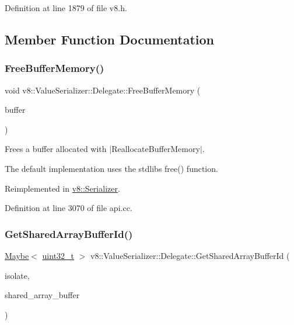 Definition at line 1879 of file v8.\+h.



\subsection{Member Function Documentation}
\mbox{\label{classv8_1_1ValueSerializer_1_1Delegate_a9cd4ab0061b4a26b4b0d695d31992f82}} 
\subsubsection{\texorpdfstring{Free\+Buffer\+Memory()}{FreeBufferMemory()}}
{\footnotesize\ttfamily void v8\+::\+Value\+Serializer\+::\+Delegate\+::\+Free\+Buffer\+Memory (\begin{DoxyParamCaption}\item[{void $\ast$}]{buffer }\end{DoxyParamCaption})\hspace{0.3cm}{\ttfamily [virtual]}}

Frees a buffer allocated with $\vert$\+Reallocate\+Buffer\+Memory$\vert$.

The default implementation uses the stdlib\textquotesingle{}s {\ttfamily free()} function. 

Reimplemented in \mbox{\hyperlink{classv8_1_1Serializer_af406a9e21fccfce3a5faed52182a69a6}{v8\+::\+Serializer}}.



Definition at line 3070 of file api.\+cc.

\mbox{\label{classv8_1_1ValueSerializer_1_1Delegate_ac12b5cfd7480c19f0b9af0b47d05a77e}} 
\subsubsection{\texorpdfstring{Get\+Shared\+Array\+Buffer\+Id()}{GetSharedArrayBufferId()}}
{\footnotesize\ttfamily \mbox{\hyperlink{classv8_1_1Maybe}{Maybe}}$<$ \mbox{\hyperlink{classuint32__t}{uint32\+\_\+t}} $>$ v8\+::\+Value\+Serializer\+::\+Delegate\+::\+Get\+Shared\+Array\+Buffer\+Id (\begin{DoxyParamCaption}\item[{Isolate $\ast$}]{isolate,  }\item[{\mbox{\hyperlink{classv8_1_1Local}{Local}}$<$ \mbox{\hyperlink{classv8_1_1SharedArrayBuffer}{Shared\+Array\+Buffer}} $>$}]{shared\+\_\+array\+\_\+buffer }\end{DoxyParamCaption})\hspace{0.3cm}{\ttfamily [virtual]}}

